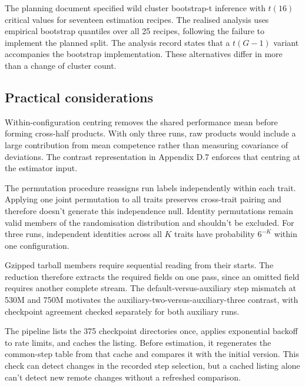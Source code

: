The planning document specified wild cluster bootstrap-t inference with $t(16)$ critical values for seventeen estimation recipes. The realised analysis uses empirical bootstrap quantiles over all 25 recipes, following the failure to implement the planned split. The analysis record states that a $t(G-1)$ variant accompanies the bootstrap implementation. These alternatives differ in more than a change of cluster count.

\subsection{Practical considerations}
Within-configuration centring removes the shared performance mean before forming cross-half products. With only three runs, raw products would include a large contribution from mean competence rather than measuring covariance of deviations. The contrast representation in Appendix D.7 enforces that centring at the estimator input.

The permutation procedure reassigns run labels independently within each trait. Applying one joint permutation to all traits preserves cross-trait pairing and therefore doesn't generate this independence null. Identity permutations remain valid members of the randomisation distribution and shouldn't be excluded. For three runs, independent identities across all $K$ traits have probability $6^{-K}$ within one configuration.

Gzipped tarball members require sequential reading from their starts. The reduction therefore extracts the required fields on one pass, since an omitted field requires another complete stream. The default-versus-auxiliary step mismatch at 530M and 750M motivates the auxiliary-two-versus-auxiliary-three contrast, with checkpoint agreement checked separately for both auxiliary runs.

The pipeline lists the 375 checkpoint directories once, applies exponential backoff to rate limits, and caches the listing. Before estimation, it regenerates the common-step table from that cache and compares it with the initial version. This check can detect changes in the recorded step selection, but a cached listing alone can't detect new remote changes without a refreshed comparison.

